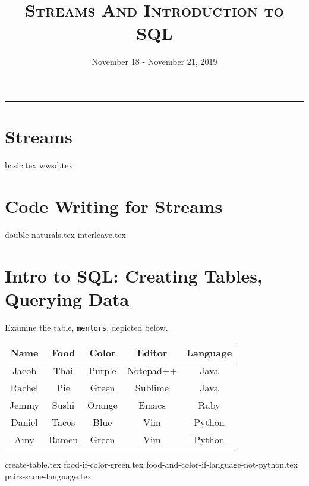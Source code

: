 \documentclass{exam}
\title{\textsc{Streams And Introduction to SQL}}
\date{November 18 - November 21, 2019}
\begin{document}
\maketitle\rule{\textwidth}{0.15em}
\fontsize{12}{15}\selectfont

\section{Streams}
\begin{questions}
{basic.tex}
\newpage
{wwsd.tex}
\end{questions}
\section{Code Writing for Streams}
\begin{questions}
{double-naturals.tex}
{interleave.tex}
\end{questions}

\section{Intro to SQL: Creating Tables, Querying Data}
Examine the table, \texttt{mentors}, depicted below.

\begin{center}
\begin{tabular}{|c|c|c|c|c|}
 \hline
 \textbf{Name} & \textbf{Food} & \textbf{Color} & \textbf{Editor} & \textbf{Language} \\
 \hline
 Jacob & Thai & Purple & Notepad++ & Java \\
 \hline
 Rachel & Pie & Green & Sublime & Java \\
 \hline
 Jemmy & Sushi & Orange & Emacs & Ruby \\
 \hline
 Daniel & Tacos & Blue & Vim & Python \\
 \hline
 Amy & Ramen & Green & Vim & Python \\
 \hline
\end{tabular}
\end{center}

\begin{questions}
{create-table.tex}
\newpage
{food-if-color-green.tex}
{food-and-color-if-language-not-python.tex}
{pairs-same-language.tex}
\end{questions}
\end{document}
